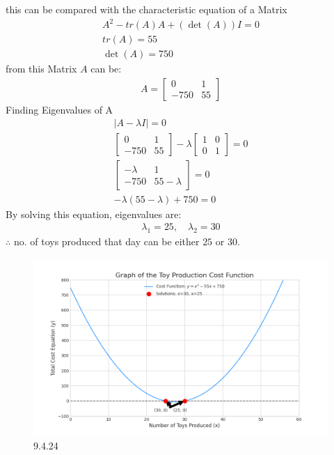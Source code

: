 \documentclass[journal]{IEEEtran}
\begin{document}
this can be compared with the characteristic equation of a Matrix
\begin{align}
A^2 - tr(A) A + (\det(A)) I = 0 \\
tr(A) = 55 \\
\det (A)= 750 
\end{align}
from this Matrix $A$ can be: \\
\begin{align}
A = \begin{bmatrix}0 & 1 \\-750 & 55\end{bmatrix}
\end{align}
Finding Eigenvalues of A
\begin{align}
|A - \lambda I| = 0\\
\begin{bmatrix}0 & 1 \\-750 & 55\end{bmatrix} - \lambda \begin{bmatrix}1 & 0 \\0 & 1\end{bmatrix} = 0\\
\begin{bmatrix}-\lambda & 1 \\-750 & 55 - \lambda\end{bmatrix} = 0\\
-\lambda(55 - \lambda) + 750 = 0
\end{align}
By solving this equation, eigenvalues are:
\begin{align}
\lambda_1 = 25, \quad \lambda_2 = 30
\end{align}
$\therefore$ no. of toys produced that day can be either $25$ or $30$.

\begin{figure}[H]
    \centering
    \includegraphics[width=0.85\columnwidth]{Figs/graph16.png}
    \caption{9.4.24}
    \label{fig:placeholder}
\end{figure}
\end{document}
